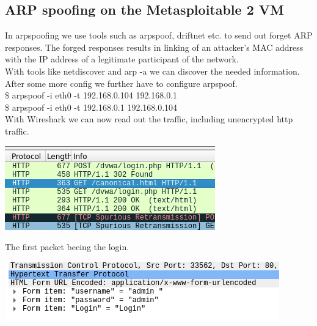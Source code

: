 \documentclass[a4paper,10pt]{article}
\begin{document}
\subsection{ARP spoofing on the Metasploitable 2 VM}
In arpspoofing we use tools such as arpspoof, driftnet etc. to send out forget ARP responses. The forged responses results in linking of an attacker’s MAC address with the IP address of a legitimate participant of the network.\\
With tools like netdiscover and arp -a we can discover the needed information.
After some more config we further have to configure arpspoof.\\
\$ arpspoof -i eth0 -t 192.168.0.104 192.168.0.1\\
\$ arpspoof -i eth0 -t 192.168.0.1 192.168.0.104\\
With Wireshark we can now read out the traffic, including unencrypted http traffic.
\begin{center}
\includegraphics[scale=0.5]{wire.png} 
\end{center}
The first packet beeing the login.
\begin{center}
 \includegraphics[scale=0.5]{login.png}
\end{center}
\end{document}
